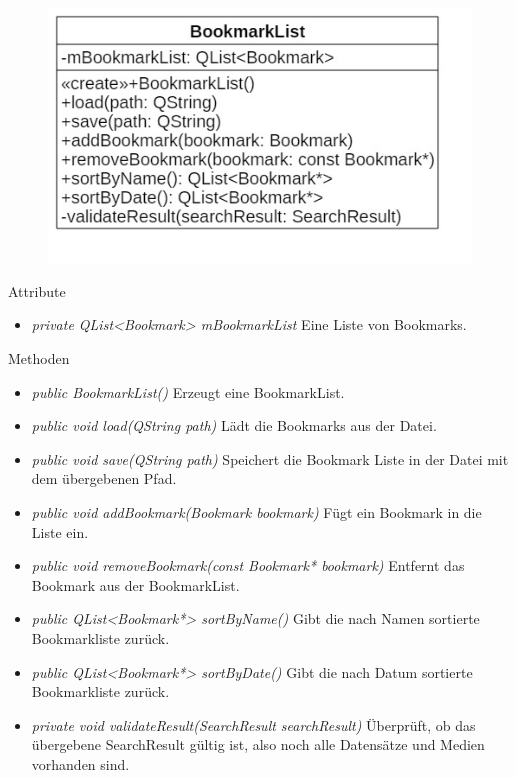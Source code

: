 \begin{figure}[H]
\centering
\includegraphics[scale=0.5]{img/Klassendiagramm/Klassen/Model/BookmarkList}
\label{fig:bookmarkList}
\end{figure}

Attribute
\begin{itemize}
\item\textit{private QList<Bookmark> mBookmarkList} Eine Liste von Bookmarks.
\end{itemize}

Methoden
\begin{itemize}
\item \textit{public BookmarkList()} Erzeugt eine BookmarkList.
\item \textit{public void load(QString path)} Lädt die Bookmarks aus der Datei.
\item \textit{public void save(QString path)} Speichert die Bookmark Liste in der Datei mit dem übergebenen Pfad.
\item \textit{public void addBookmark(Bookmark bookmark)} Fügt ein Bookmark in die Liste ein.
\item \textit{public void removeBookmark(const Bookmark* bookmark)} Entfernt das Bookmark aus der BookmarkList.
\item \textit{public QList<Bookmark*> sortByName()} Gibt die nach Namen sortierte Bookmarkliste zurück.
\item \textit{public QList<Bookmark*> sortByDate()} Gibt die nach Datum sortierte Bookmarkliste zurück.
\item \textit{private void validateResult(SearchResult searchResult)} Überprüft, ob das übergebene SearchResult gültig ist, also noch alle Datensätze und Medien vorhanden sind.
\end{itemize}


